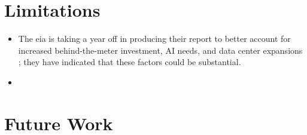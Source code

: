 \section{Limitations}
\label{sec:limitations}

\begin{itemize}
    \item The \gls{eia} is taking a year off in producing their report to better account for increased behind-the-meter investment, AI needs, and data center expansions \cite{eia_annual_outlook_canceled_2023}; they have indicated that these factors could be substantial.
    \item
\end{itemize}


\section{Future Work}
\label{sec:future_work}